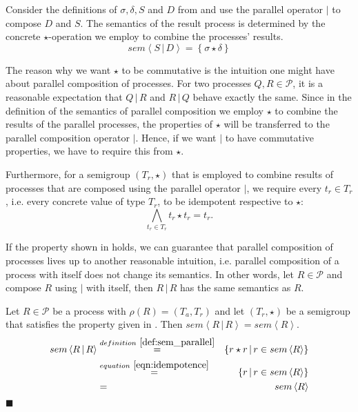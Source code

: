 \begin{example}
\label{exp:sem_parallel}
Consider the definitions of $\sigma, \delta, S$ and $D$ from  and use the parallel operator $|$ to compose $D$ and $S$. The semantics of the result process is determined by the concrete $\star$-operation we employ to combine the processes' results.
  \begin{equation}
    sem \left\langle S \,|\, D \right\rangle = \left\{ \sigma \star \delta \right\}
  \end{equation}
  \hfill\qedsymbol
\end{example}

The reason why we want $\star$ to be commutative is the intuition one might have about parallel composition of processes. For two processes $Q, R \in \mathcal{P}$, it is a reasonable expectation that $Q \,|\, R$ and $R \,|\, Q$ behave exactly the same. Since in the definition of the semantics of parallel composition we employ $\star$ to combine the results of the parallel processes, the properties of $\star$ will be transferred to the parallel composition operator $|$. Hence, if we want $|$ to have commutative properties, we have to require this from $\star$.

Furthermore, for a semigroup $\left(T_r, \star \right)$ that is employed to combine results of processes that are composed using the parallel operator $|$, we require every $t_r \in T_r$, i.e. every concrete value of type $T_r$, to be idempotent respective to $\star$:
\begin{equation}
  \label{eqn:idempotence}
  \bigwedge_{t_r \in T_r} t_r \star t_r = t_r.
\end{equation}

\begin{theorem}
If the property shown in  holds, we can guarantee that parallel composition of processes lives up to another reasonable intuition, i.e. parallel composition of a process with itself does not change its semantics. In other words, let $R \in \mathcal{P}$ and compose $R$ using $|$ with itself, then $R \,|\, R$ has the same semantics as $R$.
\end{theorem}

\begin{myproof}
Let $R \in \mathcal{P}$ be a process with $\rho \left( R \right) = \left( T_a, T_r \right)$ and let $\left( T_r, \star \right)$ be a semigroup that satisfies the property given in . Then $sem \left\langle R \,|\, R \right\rangle = sem \left\langle R \right\rangle$.
  \begin{eqnarray*}
    sem \left\langle R \,|\, R \right\rangle & \overset{\defref{def:sem_parallel}}{=} & \left\{ r \star r \,|\, r \in sem \left\langle R \right\rangle \right\} \\
    & \overset{\eqnref{eqn:idempotence}}{=} & \left\{ r \,|\, r \in sem \left\langle R \right\rangle \right\} \\
    & = & sem \left\langle R \right\rangle 
  \end{eqnarray*}
  \hfill$\blacksquare$
\end{myproof}




